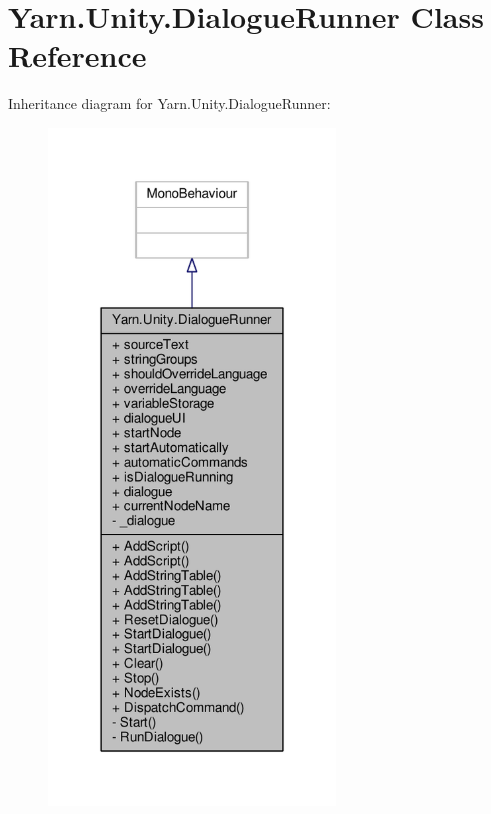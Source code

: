 \hypertarget{a00071}{\section{Yarn.\-Unity.\-Dialogue\-Runner Class Reference}
\label{a00071}
}


Inheritance diagram for Yarn.\-Unity.\-Dialogue\-Runner\-:
\nopagebreak
\begin{figure}[H]
\begin{center}
\leavevmode
\includegraphics[width=216pt]{db/dde/a00691}
\end{center}
\end{figure}


